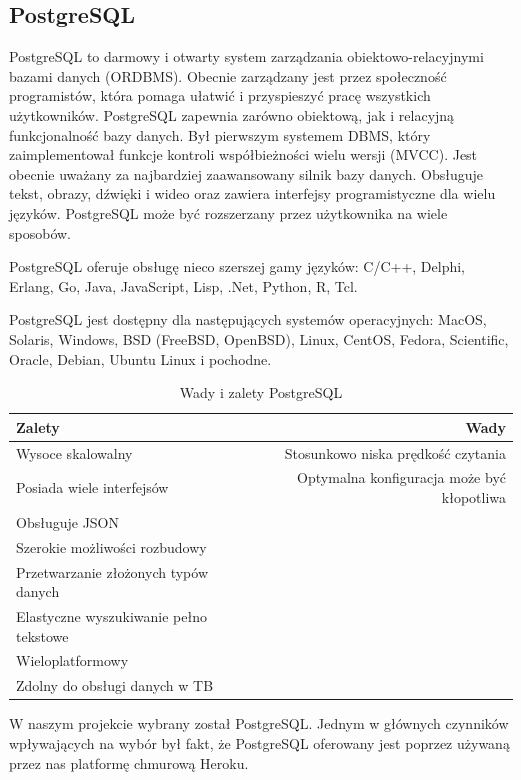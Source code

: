 \documentclass[oneside,polski,logo,indent]{amuthesis}
\begin{document}
\begin{enumerate}
\begin{enumerate}
\section{PostgreSQL}
PostgreSQL to darmowy i otwarty system zarządzania obiektowo-relacyjnymi bazami danych (ORDBMS). Obecnie zarządzany jest przez społeczność programistów, która pomaga ułatwić i przyspieszyć  pracę wszystkich użytkowników.
PostgreSQL zapewnia zarówno obiektową, jak i relacyjną funkcjonalność bazy danych. Był pierwszym systemem DBMS, który zaimplementował funkcje kontroli współbieżności wielu wersji (MVCC). Jest obecnie uważany za najbardziej zaawansowany silnik bazy danych. Obsługuje tekst, obrazy, dźwięki i wideo oraz zawiera interfejsy programistyczne dla wielu języków. PostgreSQL może być rozszerzany przez użytkownika na wiele sposobów.


PostgreSQL oferuje obsługę nieco szerszej gamy języków: C/C++, Delphi, Erlang, Go, Java, JavaScript, Lisp, .Net, Python, R, Tcl.

PostgreSQL jest dostępny dla następujących systemów operacyjnych: MacOS, Solaris, Windows, BSD (FreeBSD, OpenBSD), Linux, CentOS, Fedora, Scientific, Oracle, Debian, Ubuntu Linux i pochodne.

\begin{table}[H]
\caption{Wady i zalety PostgreSQL}
\label{tabela-PostgreSQL}
\centering
\begin{adjustbox}{width=1\textwidth}
\small
\begin{tabular}{lr}
\toprule
Zalety & Wady\\
\midrule
Wysoce skalowalny & Stosunkowo niska prędkość czytania\\ 
Posiada wiele interfejsów & Optymalna konfiguracja może być kłopotliwa\\ 
Obsługuje JSON &  \\ 
Szerokie możliwości rozbudowy &  \\ 
Przetwarzanie złożonych typów danych &  \\ 
Elastyczne wyszukiwanie pełno tekstowe  &  \\ 
Wieloplatformowy &  \\ 
Zdolny do obsługi danych w TB &  \\ 
\bottomrule
\end{tabular}
\end{adjustbox}
\end{table}
  

W naszym projekcie wybrany został PostgreSQL. Jednym w głównych czynników wpływających na wybór był fakt, że PostgreSQL oferowany jest poprzez używaną przez nas platformę chmurową Heroku. 

\end{enumerate}
\end{enumerate}
\end{document}
